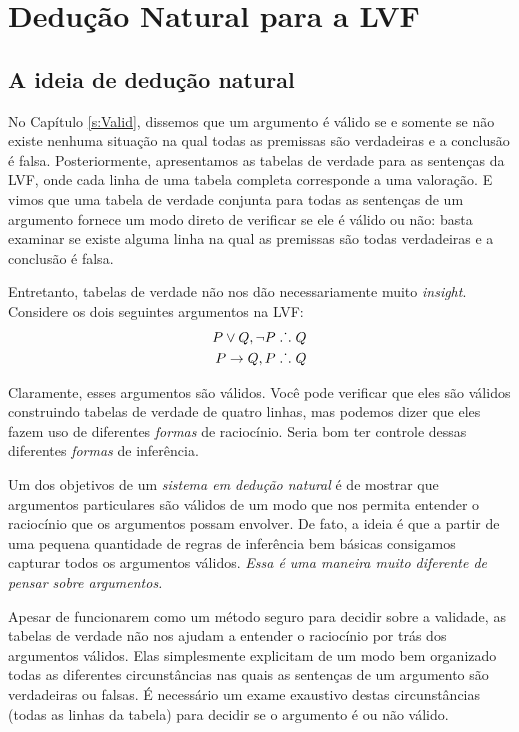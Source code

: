 \part{Dedução Natural para a LVF}
\label{ch.NDTFL}

 
\chapter{A ideia de dedução natural}\label{s:NDVeryIdea}

No  Capítulo  \ref{s:Valid}, dissemos que um argumento é válido se e somente se não existe nenhuma situação na qual todas as premissas são verdadeiras e a conclusão é falsa. Posteriormente,  apresentamos as tabelas de verdade para as sentenças da LVF, onde  cada linha de uma tabela completa corresponde a uma valoração. E vimos que uma tabela de verdade conjunta para todas as sentenças de um argumento fornece um modo direto de verificar se ele é válido ou não: basta examinar se existe alguma linha na qual as premissas são todas verdadeiras e a conclusão é falsa.

Entretanto, tabelas de verdade não nos dão necessariamente muito \emph{insight}. Considere os dois seguintes argumentos na LVF:
\begin{align*}
P \vee Q, \neg P & \mathrel{\ldotp\dot{}\,\ldotp} Q\\
P \rightarrow Q, P & \mathrel{\ldotp\dot{}\,\ldotp} Q
\end{align*}

Claramente, esses argumentos são válidos. Você  pode verificar que eles são válidos construindo tabelas de verdade de quatro linhas, mas podemos dizer que eles fazem uso de diferentes \emph{formas}  de raciocínio. Seria bom ter controle dessas diferentes \emph{formas}  de inferência.

Um dos objetivos de um \emph{sistema em dedução natural} é de mostrar que argumentos particulares são  válidos de um modo que nos permita entender o raciocínio que os argumentos possam envolver.  De fato, a ideia é que a partir de uma pequena quantidade de regras de inferência bem básicas consigamos capturar todos os argumentos válidos.
\emph{Essa é uma maneira muito diferente de pensar sobre argumentos.} 

Apesar de funcionarem como um método seguro para decidir sobre a validade, as tabelas de verdade não nos ajudam a entender o raciocínio por trás dos argumentos válidos. Elas simplesmente explicitam de um modo bem organizado todas as diferentes circunstâncias nas quais as sentenças de um argumento são verdadeiras ou falsas. É necessário um exame exaustivo destas circunstâncias (todas as linhas da tabela) para decidir se o argumento é ou não válido.

